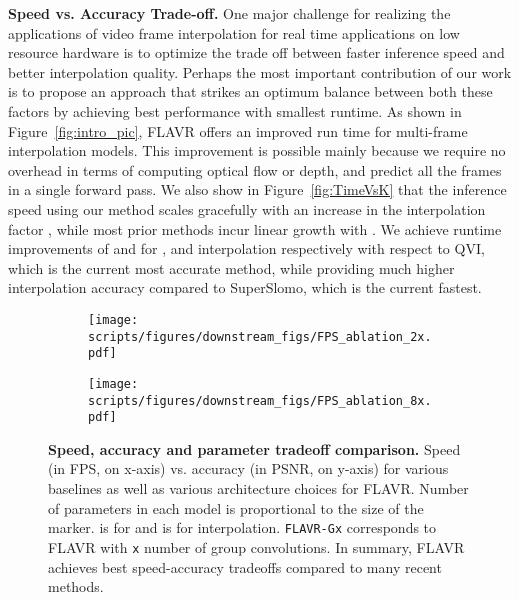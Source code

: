 \documentclass[10pt,twocolumn,letterpaper]{article}
\newcommand{\figref}[1]{Figure~\ref{#1}}
\newcommand{\red}[1]{{#1}}
\newcommand{\Ours}{FLAVR}
\newcommand{\twox}{}
\newcommand{\eightx}{}
\begin{document}
\begin{table*}[!t]
{\bf Speed vs. Accuracy Trade-off.}
One major challenge for realizing the applications of video frame interpolation for real time applications on low resource hardware is to optimize the trade off between faster inference speed and better interpolation quality. 
Perhaps the most important contribution of our work is to propose an approach that strikes an optimum balance between both these factors by achieving best performance with smallest runtime. \red{As shown in \figref{fig:intro_pic}, FLAVR offers an improved run time for multi-frame interpolation models.
This improvement is possible mainly because we require no overhead in terms of computing optical flow or depth, and predict all the frames in a single forward pass. We also show in \figref{fig:TimeVsK} that the inference speed using our method scales gracefully with an increase in the interpolation factor , while most prior methods incur linear growth with . We achieve runtime improvements of  and  for \eightx{},  and  interpolation respectively with respect to QVI, which is the current most accurate method, while providing much higher interpolation accuracy compared to SuperSlomo, which is the current fastest.} 



\begin{figure}[t]
     \centering
     \begin{subfigure}[t]{0.23\textwidth}
         \centering
         \texttt{[image: scripts/figures/downstream\_figs/FPS\_ablation\_2x.pdf]}
         \subcaption{\twox{} interpolation}
         \label{fig:tradeoff2x}
     \end{subfigure}
\begin{subfigure}[t]{0.23\textwidth}
         \centering
         \texttt{[image: scripts/figures/downstream\_figs/FPS\_ablation\_8x.pdf]}
         \subcaption{\eightx{} interpolation}
         \label{fig:tradeoff8x}
     \end{subfigure}
     \vspace{-8pt}
    \caption{{\bf Speed, accuracy and parameter tradeoff comparison.} Speed (in FPS, on x-axis) vs. accuracy (in PSNR, on y-axis) for various baselines as well as various architecture choices for \Ours{}. Number of parameters in each model is proportional to the size of the marker.  is for \twox{} and  is for \eightx{} interpolation. \texttt{FLAVR-Gx} corresponds to \Ours{} with \texttt{x} number of group convolutions. In summary, \Ours{} achieves best speed-accuracy tradeoffs compared to many recent methods.
    }
    \label{fig:SpeedVsAccuracy}
    \vspace{-16pt}
\end{figure}
%
 

\end{table*}
\end{document}
